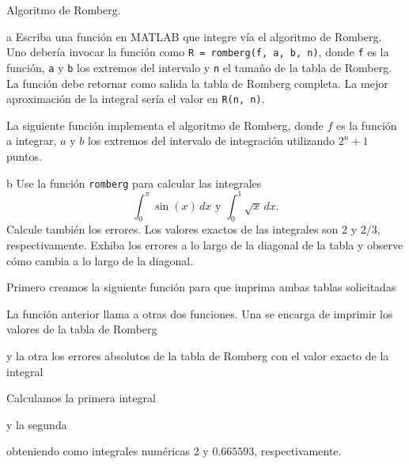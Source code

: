 \begin{statement}{3}
  Algoritmo de Romberg.
\end{statement}

\begin{statement}{a}
  Escriba una funci\'on en MATLAB que integre v\'ia el algoritmo de Romberg.
  Uno deber\'ia invocar la funci\'on como \texttt{R = romberg(f, a, b, n)},
  donde
  \texttt{f} es la funci\'on,
  \texttt{a} y \texttt{b} los extremos del intervalo
  y \texttt{n} el tama\~no de la tabla de Romberg.
  La funci\'on debe retornar como salida la tabla de Romberg completa.
  La mejor aproximaci\'on de la integral ser\'ia el valor en \texttt{R(n, n)}.
\end{statement}

\begin{solution}
  La siguiente funci\'on implementa el algoritmo de Romberg, donde
  $f$ es la funci\'on a integrar,
  $a$ y $b$ los extremos del intervalo de integraci\'on
  utilizando $2^n + 1$ puntos.
  
\end{solution}

\begin{statement}{b}
  Use la funci\'on \texttt{romberg} para calcular las integrales
  \[
    \int_0^{\pi} \sin(x) \, dx \text{ y } \int_0^1 \sqrt{x} \, dx.
  \]
  Calcule tambi\'en los errores.
  Los valores exactos de las integrales son $2$ y $2 / 3$, respectivamente.
  Exhiba los errores a lo largo de la diagonal de la tabla
  y observe c\'omo cambia a lo largo de la diagonal.
\end{statement}

\begin{solution}
  Primero creamos la siguiente funci\'on para que imprima ambas tablas solicitadas
  
  La funci\'on anterior llama a otras dos funciones.
  Una se encarga de imprimir los valores de la tabla de Romberg
  
  y la otra los errores absolutos de la tabla de Romberg con el valor exacto de la integral
  
  Calculamos la primera integral
  
  
  y la segunda
  
  
  obteniendo como integrales num\'ericas $2$ y $0.665593$, respectivamente.
\end{solution}

